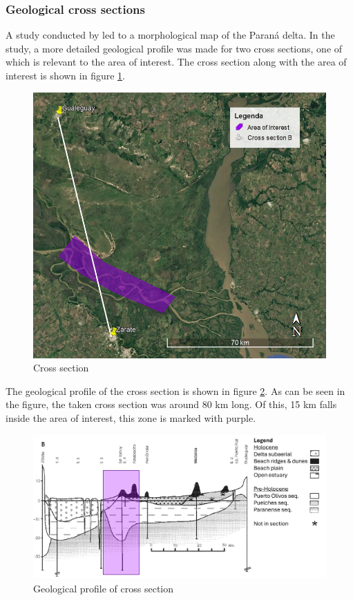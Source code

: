 \subsubsection{Geological cross sections}
A study conducted by \citeauthor{joseluiscavallottoEvolucionCambiosAmbientales2005} led to a morphological map of the Paraná delta. In the study, a more detailed geological profile was made for two cross sections, one of which is relevant to the area of interest. The cross section along with the area of interest is shown in figure \ref{fig:crosssectiongeo}.

\begin{figure}[H]
    \centering
    \includegraphics[width=0.75\linewidth]{figures/ch9/CrossSectionB.png}
    \caption{Cross section}
    \label{fig:crosssectiongeo}
\end{figure}

The geological profile of the cross section is shown in figure \ref{fig:geolprofile}. As can be seen in the figure, the taken cross section was around 80 km long. Of this, 15 km falls inside the area of interest, this zone is marked with purple.

\begin{figure}[H]
    \centering
    \includegraphics[width=1\linewidth]{figures/ch9/CrossSectionBResults.png}
    \caption{Geological profile of cross section \autocite{joseluiscavallottoEvolucionCambiosAmbientales2005}}
    \label{fig:geolprofile}
\end{figure}

